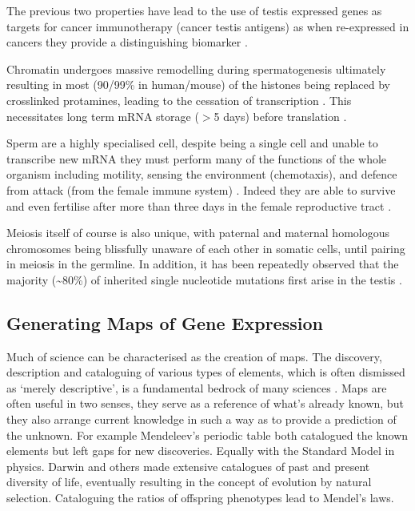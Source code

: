  The previous two properties have lead to the use of testis expressed genes as targets for cancer immunotherapy (cancer testis antigens) as when re-expressed in cancers they provide a distinguishing biomarker \parencite{Whitehurst2014Cause}.

Chromatin undergoes massive remodelling during spermatogenesis ultimately resulting in most (90/99\% in human/mouse) of the histones being replaced by crosslinked protamines, leading to the cessation of transcription \parencite{Rathke2014Chromatin}. This necessitates long term mRNA storage ($>$5 days) before translation \parencite{Kleene2013Connecting}.

Sperm are a highly specialised cell, despite being a single cell and unable to transcribe new mRNA they must perform many of the functions of the whole organism including motility, sensing the environment (chemotaxis), and defence from attack (from the female immune system) \parencite{Kaupp2008Mechanisms, Thompson1992Leukocytic}. Indeed they are able to survive and even fertilise after more than three days in the female reproductive tract \parencite{Gould1984Assessment,Wilcox1995Timing}.

Meiosis itself of course is also unique, with paternal and maternal homologous chromosomes being blissfully unaware of each other in somatic cells, until pairing in meiosis in the germline. In addition, it has been repeatedly observed that the majority (\textasciitilde80\%) of inherited single nucleotide mutations first arise in the testis \parencite{Kong2012Rate, Michaelson2012WholeGenome, Goldmann2016Parentoforiginspecific, Rahbari2016Timing, Jonsson2017Parental}.



\subsection{Generating Maps of Gene Expression}
Much of science can be characterised as the creation of maps. The discovery, description and cataloguing of various types of elements, which is often dismissed as `merely descriptive', is a fundamental bedrock of many sciences \parencite{Grimaldi2007Why}. Maps are often useful in two senses, they serve as a reference of what's already known, but they also arrange current knowledge in such a way as to provide a prediction of the unknown. For example Mendeleev's periodic table both catalogued the known elements but left gaps for new discoveries. Equally with the Standard Model in physics. Darwin and others made extensive catalogues of past and present diversity of life, eventually resulting in the concept of evolution by natural selection. Cataloguing the ratios of offspring phenotypes lead to Mendel's laws.


